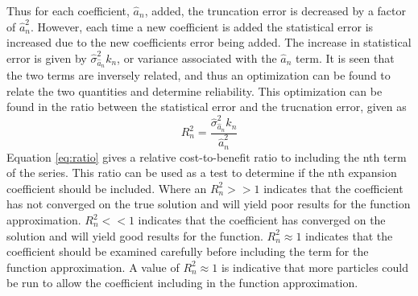 \documentclass[10tma4paper]{article}
\begin{document}
Thus for each coefficient, $\hat{a}_{n}$, added, the truncation error is decreased by a factor of $\hat{a}_{n}^2$. However, each time a new coefficient is added the statistical error is increased due to the new coefficients error being added. The increase in statistical error is given by $\hat{\sigma}_{\hat{a}_{n}}^2k_{n}$, or variance associated with the $\hat{a}_{n}$ term. It is seen that the two terms are inversely related, and thus an optimization can be found to relate the two quantities and determine reliability. This optimization can be found in the ratio between the statistical error and the trucnation error, given as
\begin{equation}\label{eq:ratio}
R_{n}^2=\frac{\hat{\sigma}_{\hat{a}_{n}}^2k_{n}}{\hat{a}_{n}^2}
\end{equation}
Equation \eqref{eq:ratio} gives a relative cost-to-benefit ratio to including the nth term of the series. This ratio can be used as a test to determine if the nth expansion coefficient should be included. Where an $R_{n}^2>>1$ indicates that the coefficient has not converged on the true solution and will yield poor results for the function approximation. $R_{n}^2<<1$ indicates that the coefficient has converged on the solution and will yield good results for the function. $R_{n}^2\approx1$ indicates that the coefficient should be examined carefully before including the term for the function approximation. A value of $R_{n}^2\approx1$ is indicative that more particles could be run to allow the coefficient including in the function approximation.
\end{document}
